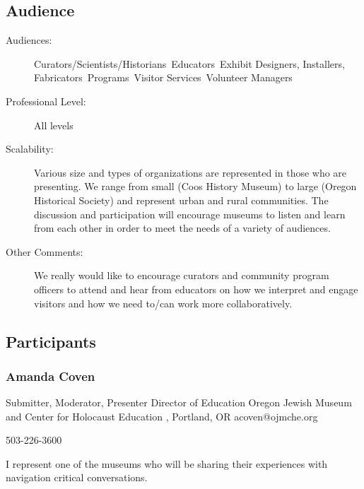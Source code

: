 \documentclass{report}
\begin{document}
              \subsection*{Audience}
                \begin{description}
                  \item [Audiences:]Curators/Scientists/Historians~Educators~Exhibit Designers, Installers, Fabricators~Programs~Visitor Services~Volunteer Managers~
                  \item[Professional Level:]All levels~
                \item[Scalability:] Various size and types of organizations are represented in those who are presenting. We range from small (Coos History Museum) to large (Oregon Historical Society) and represent urban and rural communities. The discussion and participation will encourage museums to listen and learn from each other in order to meet the needs of a variety of audiences.

							
              \item[Other Comments:] We really would like to encourage curators and community program officers to attend and hear from educators on how we interpret and engage visitors and how we need to/can work more collaboratively.
              \end{description}
            \subsection*{Participants}
              \subsubsection*{ Amanda  Coven }
              Submitter, Moderator, Presenter\newline
              Director of Education \newline
              Oregon Jewish Museum and Center for Holocaust Education , Portland, OR
              \newline
              acoven@ojmche.org\newline
              
              503-226-3600\newline

              I represent one of the museums who will be sharing their experiences with navigation critical conversations.\newline
\end{document}
